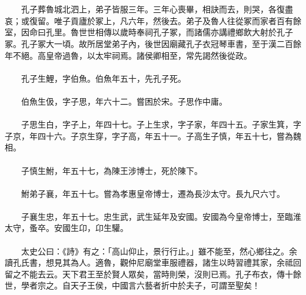 \\\\
　　孔子葬魯城北泗上，弟子皆服三年。三年心喪畢，相訣而去，則哭，各復盡哀；或復留。唯子貢廬於冢上，凡六年，然後去。弟子及魯人往從冢而家者百有餘室，因命曰孔里。魯世世相傳以歲時奉祠孔子冢，而諸儒亦講禮鄉飲大射於孔子冢。孔子冢大一頃。故所居堂弟子內，後世因廟藏孔子衣冠琴車書，至于漢二百餘年不絕。高皇帝過魯，以太牢祠焉。諸侯卿相至，常先謁然後從政。
\\\\
　　孔子生鯉，字伯魚。伯魚年五十，先孔子死。
\\\\
　　伯魚生伋，字子思，年六十二。嘗困於宋。子思作中庸。
\\\\
　　子思生白，字子上，年四十七。子上生求，字子家，年四十五。子家生箕，字子京，年四十六。子京生穿，字子高，年五十一。子高生子慎，年五十七，嘗為魏相。
\\\\
　　子慎生鮒，年五十七，為陳王涉博士，死於陳下。
\\\\
　　鮒弟子襄，年五十七。嘗為孝惠皇帝博士，遷為長沙太守。長九尺六寸。
\\\\
　　子襄生忠，年五十七。忠生武，武生延年及安國。安國為今皇帝博士，至臨淮太守，蚤卒。安國生卬，卬生驩。
\\\\
　　太史公曰：《詩》有之：「高山仰止，景行行止。」雖不能至，然心鄉往之。余讀孔氏書，想見其為人。適魯，觀仲尼廟堂車服禮器，諸生以時習禮其家，余祗回留之不能去云。天下君王至於賢人眾矣，當時則榮，沒則已焉。孔子布衣，傳十餘世，學者宗之。自天子王侯，中國言六藝者折中於夫子，可謂至聖矣！


